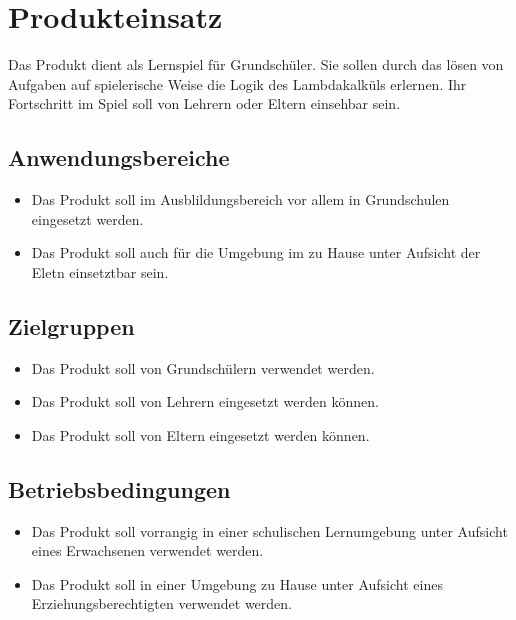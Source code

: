 \section{Produkteinsatz}

Das Produkt dient als Lernspiel für Grundschüler. Sie sollen durch das lösen von Aufgaben auf spielerische Weise die Logik des Lambdakalküls erlernen. Ihr Fortschritt im Spiel soll von Lehrern oder Eltern einsehbar sein.

\subsection{Anwendungsbereiche}
\begin{itemize}
	\item Das Produkt soll im Ausblildungsbereich vor allem in Grundschulen eingesetzt werden.
	\item Das Produkt soll auch für die Umgebung im zu Hause unter Aufsicht der Eletn einsetztbar sein.
\end{itemize}


\subsection{Zielgruppen}

\begin{itemize}
	\item Das Produkt soll von Grundschülern verwendet werden.
	\item Das Produkt soll von Lehrern eingesetzt werden können. 
	\item Das Produkt soll von Eltern eingesetzt werden können.
\end{itemize}

\subsection{Betriebsbedingungen}
\begin{itemize}
	\item Das Produkt soll vorrangig  in einer schulischen Lernumgebung unter Aufsicht eines Erwachsenen verwendet werden.
	\item Das Produkt soll in einer Umgebung zu Hause unter Aufsicht eines Erziehungsberechtigten verwendet werden.
\end{itemize}
